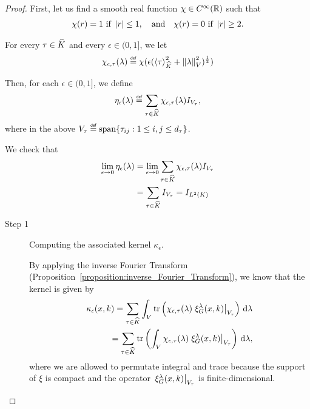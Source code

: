 \begin{proof}
    First, let us find a smooth real function $\chi \in {C^\infty(\mathbb{R})}$ such that
    \begin{align*}
        \chi(r) = 1 \  \text{if}\  \left|{r}\right| \leq 1, \quad \text{and} \quad
        \chi(r) = 0 \ \text{if}\  \left|{r}\right| \geq 2.
    \end{align*}

    For every $\tau \in {\widehat{K}}$ and every $\epsilon \in (0, 1]$,
    we let
    \begin{align*}
        \chi_{\epsilon, \tau}(\lambda)
        \defeq \chi(\epsilon(\JapaneseBracket \CompactGroup \tau^2 + \norm \lambda^2)^{\frac 1 2})
    \end{align*}

    Then, for each $\epsilon \in (0, 1]$,
    we define
    \begin{align*}
        \eta_\epsilon(\lambda)
        \defeq \sum_{\tau \in \dualGroup \CompactGroup} \chi_{\epsilon, \tau}(\lambda) \Id {V_\tau},
    \end{align*}
    where in the above $V_\tau \defeq \Span \{\tau_{ij} : 1 \leq i, j \leq \dimRep \tau\}$.

    We check that
    \begin{align*}
        \lim_{\epsilon \to 0} \eta_\epsilon(\lambda)
        &= \lim_{\epsilon \to 0} \sum_{\tau \in {\widehat{K}}} \chi_{\epsilon, \tau} (\lambda) {I_{V_\tau}}\\
        &= \sum_{\tau \in {\widehat{K}}} {I_{V_\tau}}
        = {I_{{L^{2} (K)}}}
    \end{align*}

    \begin{description}
        \item [Step 1] Computing the associated kernel $\kappa_\epsilon$.

            By applying the inverse Fourier Transform (Proposition~\ref{proposition:inverse_Fourier_Transform}),
            we know that the kernel is given by
            \begin{align}
                \kappa_\epsilon(x, k)
                = \sum_{\tau \in {\widehat{K}}}
                \int_V
                \operatorname{tr} \left(\chi_{\epsilon, \tau} (\lambda) \left. \xi^{\lambda}_{G}(x, k) \right|_{V_\tau}\right) \,\mathrm{d} \lambda \notag\\
                = \sum_{\tau \in {\widehat{K}}}
                \operatorname{tr} \left(\int_V
                \chi_{\epsilon, \tau} (\lambda) \left. \xi^{\lambda}_{G}(x, k) \right|_{V_\tau}\right) \,\mathrm{d} \lambda,
                \label{eq:Littlewood-Paley:computing_kernel}
            \end{align}
            where we are allowed to permutate integral and trace because the support of $\xi$ is compact
            and the operator $\left. \xi^{\lambda}_{G}(x, k) \right|_{V_\tau}$ is finite-dimensional.


\end{description}
\end{proof}

